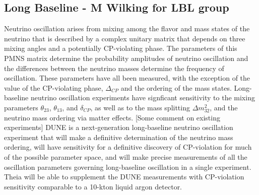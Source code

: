 \subsection{Long Baseline - M Wilking for LBL group}

Neutrino oscillation arises from mixing among the flavor and mass states of the neutrino that is described
by a complex unitary matrix that depends on three mixing angles and a potentially CP-violating phase. The
parameters of this PMNS matrix determine the probability amplitudes of neutrino oscillation and the
differences between the neutrino masses determine the frequency of oscillation. These parameters have
all been measured, with the exception of the value of the CP-violating phase, $\Delta_{CP}$ and the ordering
of the mass states. Long-baseline neutrino oscillation experiments have signficant sensitivity to the
mixing parameters $\theta_{23}$, $\theta_{13}$, and $\delta_{CP}$, as well as to the mass splitting
$\Delta m^{2}_{32}$, and the neutrino mass ordering via matter effects. [Some comment on existing experiments]
DUNE is a next-generation long-baseline neutrino oscillation experiment that will make a definitive
determination of the neutrino mass ordering, will have sensitivity for a definitive discovery of CP-violation
for much of the possible parameter space, and will make precise measurements of all the oscillation
parameters governing long-baseline oscillation in a single experiment.
Theia will be able to supplement the DUNE measurements with CP-violation sensitivity comparable to a
10-kton liquid argon detector.

